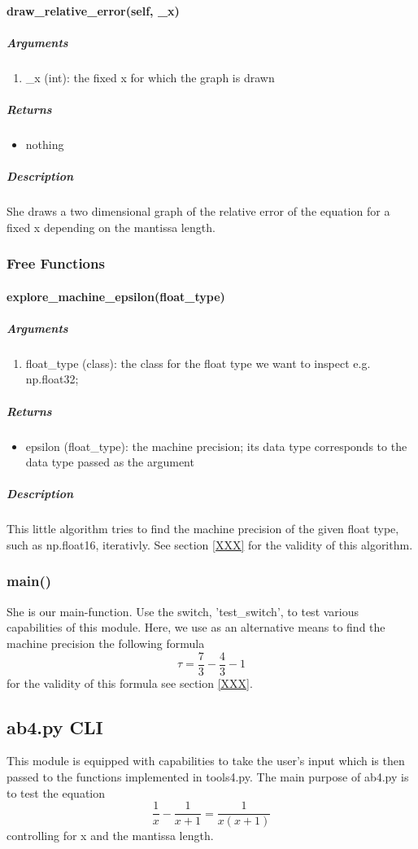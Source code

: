 \paragraph{draw\_relative\_error(self, \_x)}
\subparagraph*{Arguments}
\begin{enumerate}
    \item \_x (int): the fixed x for which the graph is drawn
\end{enumerate}
\subparagraph*{Returns}
\begin{itemize}
    \item nothing
\end{itemize}
\subparagraph*{Description}
She draws a two dimensional graph of the relative error of the equation for a fixed x depending on the mantissa length.
\subsubsection{Free Functions}
\paragraph{explore\_machine\_epsilon(float\_type)}
\subparagraph*{Arguments}
\begin{enumerate}
    \item float\_type (class): the class for the float type we want to inspect e.g. np.float32;
\end{enumerate}
\subparagraph*{Returns}
\begin{itemize}
    \item epsilon (float\_type): the machine precision; its data type corresponds to the data type passed as the argument
\end{itemize}
\subparagraph*{Description}
This little algorithm tries to find the machine precision of the given float type, such as np.float16, iterativly. See section \ref{XXX} for the validity of this algorithm.
\subsubsection{main()}
She is our main-function. Use the switch, 'test\_switch', to test various capabilities of this module.
Here, we use as an alternative means to find the machine precision the following formula
\begin{equation*}
    \tau = \frac{7}{3} - \frac{4}{3} - 1
\end{equation*}
for the validity of this formula see section \ref{XXX}.
%
%
%
%
%
\subsection{ab4.py CLI}
This module is equipped with capabilities to take the user's input which is then passed to the functions implemented in tools4.py. The main purpose of ab4.py is to test the equation 
\begin{equation*}
    \frac{1}{x} - \frac{1}{x + 1} = \frac{1}{x (x + 1)}
\end{equation*}
controlling for x and the mantissa length.
